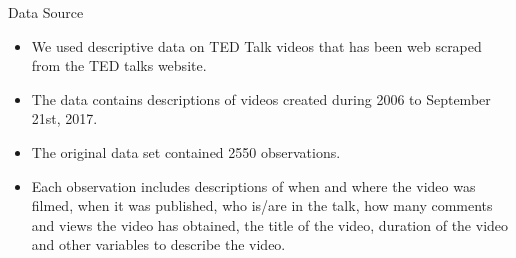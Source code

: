 \begin{frame}{Data Source}
\begin{itemize}
	\item We used descriptive data on TED Talk videos that has been web scraped from the TED talks website. 
	\item The data contains descriptions of videos created during 2006 to September 21st, 2017. 
	\item The original data set contained 2550 observations. 
	\item Each observation includes descriptions of when and where the video was filmed, when it was published, who is/are in the talk, how many comments and views the video has obtained, the title of the video, duration of the video and other variables to describe the video.
\end{itemize}
\end{frame}